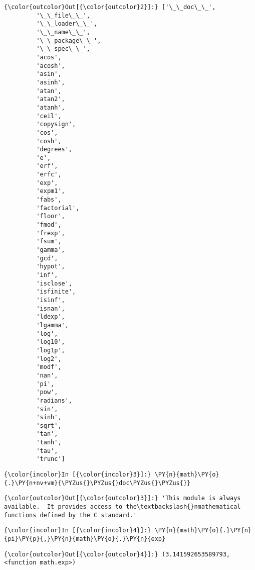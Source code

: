             \begin{Verbatim}[commandchars=\\\{\}]
{\color{outcolor}Out[{\color{outcolor}2}]:} ['\_\_doc\_\_',
         '\_\_file\_\_',
         '\_\_loader\_\_',
         '\_\_name\_\_',
         '\_\_package\_\_',
         '\_\_spec\_\_',
         'acos',
         'acosh',
         'asin',
         'asinh',
         'atan',
         'atan2',
         'atanh',
         'ceil',
         'copysign',
         'cos',
         'cosh',
         'degrees',
         'e',
         'erf',
         'erfc',
         'exp',
         'expm1',
         'fabs',
         'factorial',
         'floor',
         'fmod',
         'frexp',
         'fsum',
         'gamma',
         'gcd',
         'hypot',
         'inf',
         'isclose',
         'isfinite',
         'isinf',
         'isnan',
         'ldexp',
         'lgamma',
         'log',
         'log10',
         'log1p',
         'log2',
         'modf',
         'nan',
         'pi',
         'pow',
         'radians',
         'sin',
         'sinh',
         'sqrt',
         'tan',
         'tanh',
         'tau',
         'trunc']
\end{Verbatim}
        
    \begin{Verbatim}[commandchars=\\\{\}]
{\color{incolor}In [{\color{incolor}3}]:} \PY{n}{math}\PY{o}{.}\PY{n+nv+vm}{\PYZus{}\PYZus{}doc\PYZus{}\PYZus{}}
\end{Verbatim}

            \begin{Verbatim}[commandchars=\\\{\}]
{\color{outcolor}Out[{\color{outcolor}3}]:} 'This module is always available.  It provides access to the\textbackslash{}nmathematical functions defined by the C standard.'
\end{Verbatim}
        
    \begin{Verbatim}[commandchars=\\\{\}]
{\color{incolor}In [{\color{incolor}4}]:} \PY{n}{math}\PY{o}{.}\PY{n}{pi}\PY{p}{,}\PY{n}{math}\PY{o}{.}\PY{n}{exp}
\end{Verbatim}

            \begin{Verbatim}[commandchars=\\\{\}]
{\color{outcolor}Out[{\color{outcolor}4}]:} (3.141592653589793, <function math.exp>)
\end{Verbatim}
        
